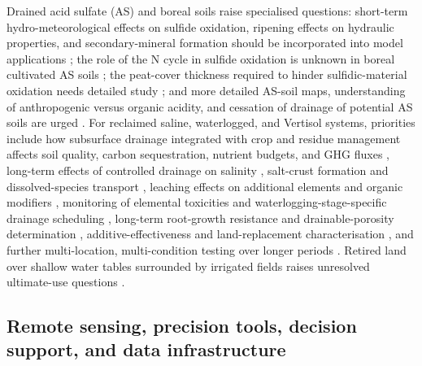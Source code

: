 \documentclass[11pt]{article}
\begin{document}
Drained acid sulfate (AS) and boreal soils raise specialised questions: short-term hydro-meteorological effects on sulfide oxidation, ripening effects on hydraulic properties, and secondary-mineral formation should be incorporated into model applications \parencite{Salo2023}; the role of the N cycle in sulfide oxidation is unknown in boreal cultivated AS soils \parencite{Virtanen2017}; the peat-cover thickness required to hinder sulfidic-material oxidation needs detailed study \parencite{YliHalla2022}; and more detailed AS-soil maps, understanding of anthropogenic versus organic acidity, and cessation of drainage of potential AS soils are urged \parencite{Åström2005}. For reclaimed saline, waterlogged, and Vertisol systems, priorities include how subsurface drainage integrated with crop and residue management affects soil quality, carbon sequestration, nutrient budgets, and GHG fluxes \parencite{Mukhopadhyay2023,Mukhopadhyay2023b}, long-term effects of controlled drainage on salinity \parencite{ElGhannam2023}, salt-crust formation and dissolved-species transport \parencite{Colombani2016}, leaching effects on additional elements and organic modifiers \parencite{SoltaniGerdefaramarzi2020}, monitoring of elemental toxicities and waterlogging-stage-specific drainage scheduling \parencite{Qian2021}, long-term root-growth resistance and drainable-porosity determination \parencite{Bahçeci2018,Bahceci2008}, additive-effectiveness and land-replacement characterisation \parencite{Isa2023}, and further multi-location, multi-condition testing over longer periods \parencite{Sadhukhan2019}. Retired land over shallow water tables surrounded by irrigated fields raises unresolved ultimate-use questions \parencite{Purkey2001}.

\subsection{Remote sensing, precision tools, decision support, and data infrastructure}
\end{document}

